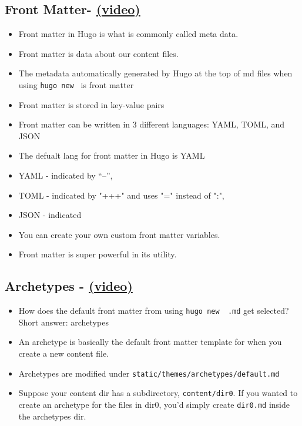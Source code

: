 \subsection{Front Matter- \href{https://youtu.be/Yh2xKRJGff4?list=PLLAZ4kZ9dFpOnyRlyS-liKL5ReHDcj4G3 }{(video)} }
\begin{itemize}
	\item
	Front matter in Hugo is what is commonly called meta data.
	\item
	Front matter is data about our content files.
	\item
	The metadata automatically generated by Hugo at the top of md files when using \texttt{hugo new } is front matter
	\item
	Front matter is stored in key-value pairs
	\item
	Front matter can be written in 3 different languages: YAML, TOML, and JSON
	\item
	The defualt lang for front matter in Hugo is YAML
	\item
	YAML - indicated by ``--'',
	\item
	TOML - indicated by "+++" and uses "=" instead of ":",
	\item
	JSON - indicated
	\item
	You can create your own custom front matter variables.
	\item
	Front matter is super powerful in its utility.
\end{itemize}


\subsection{Archetypes - \href{https://youtu.be/bcme8AzVh6o?list=PLLAZ4kZ9dFpOnyRlyS-liKL5ReHDcj4G3 }{(video)} }
\begin{itemize}
	\item
	How does the default front matter from using \texttt{hugo new ~.md} get selected? Short answer: archetypes
	\item
	An archetype is basically the default front matter template for when you create a new content file.
	\item
	Archetypes are modified under \texttt{static/themes/archetypes/default.md}
	\item
	Suppose your content dir has a subdirectory, \texttt{content/dir0}. If you wanted to create an archetype for the files in dir0, you'd simply create \texttt{dir0.md} inside the archetypes dir.
\end{itemize}


